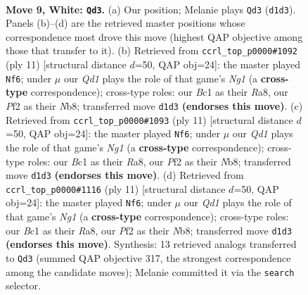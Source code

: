 \documentclass[11pt]{article}
\begin{document}
\clearpage

\begin{figure}[p]\centering
\begin{subfigure}{0.46\textwidth}\centering
\resizebox{\linewidth}{!}{%
\newchessgame
\chessboard[
  setfen={rnbqr1k1/ppp1bppp/4p3/3n4/2NP4/6P1/PP2PPBP/RNBQ1RK1 w - - 1 9},
  showmover=false,
  pgfstyle=straightmove, color=movearrow, markmove={d1-d3}
]}
\caption{}
\end{subfigure}\hfill
\begin{subfigure}{0.46\textwidth}\centering
\resizebox{\linewidth}{!}{%
\newchessgame
\chessboard[
  setfen={rnbqk1nr/pp2ppbp/3p2p1/8/3NP3/2N1B3/PPP2PPP/R2QKB1R b KQkq - 3 6},
  showmover=false,
  pgfstyle=straightmove, color=movearrow, markmove={g8-f6}
]}
\caption{}
\end{subfigure}
\\[4pt]
\begin{subfigure}{0.46\textwidth}\centering
\resizebox{\linewidth}{!}{%
\newchessgame
\chessboard[
  setfen={rnbqk1nr/pp2ppbp/3p2p1/8/3NP3/2N1B3/PPP2PPP/R2QKB1R b KQkq - 3 6},
  showmover=false,
  pgfstyle=straightmove, color=movearrow, markmove={g8-f6}
]}
\caption{}
\end{subfigure}\hfill
\begin{subfigure}{0.46\textwidth}\centering
\resizebox{\linewidth}{!}{%
\newchessgame
\chessboard[
  setfen={rnbqk1nr/pp2ppbp/3p2p1/8/3NP3/2N1B3/PPP2PPP/R2QKB1R b KQkq - 3 6},
  showmover=false,
  pgfstyle=straightmove, color=movearrow, markmove={g8-f6}
]}
\caption{}
\end{subfigure}
\caption{\textbf{Move 9, White: \texttt{Qd3}.} (a) Our position; Melanie plays \texttt{Qd3} (\texttt{d1d3}). Panels (b)--(d) are the retrieved master positions whose correspondence most drove this move (highest QAP objective among those that transfer to it). (b) Retrieved from \texttt{ccrl\_top\_p0000\#1092} (ply 11) [structural distance $d$=50, QAP obj=24]: the master played \texttt{Nf6}; under $\mu$ our \emph{Qd1} plays the role of that game's \emph{Ng1} (a \textbf{cross-type} correspondence); cross-type roles: our \emph{B}c1 as their \emph{R}a8, our \emph{P}f2 as their \emph{N}b8; transferred move \texttt{d1d3} \textbf{(endorses this move)}. (c) Retrieved from \texttt{ccrl\_top\_p0000\#1093} (ply 11) [structural distance $d$=50, QAP obj=24]: the master played \texttt{Nf6}; under $\mu$ our \emph{Qd1} plays the role of that game's \emph{Ng1} (a \textbf{cross-type} correspondence); cross-type roles: our \emph{B}c1 as their \emph{R}a8, our \emph{P}f2 as their \emph{N}b8; transferred move \texttt{d1d3} \textbf{(endorses this move)}. (d) Retrieved from \texttt{ccrl\_top\_p0000\#1116} (ply 11) [structural distance $d$=50, QAP obj=24]: the master played \texttt{Nf6}; under $\mu$ our \emph{Qd1} plays the role of that game's \emph{Ng1} (a \textbf{cross-type} correspondence); cross-type roles: our \emph{B}c1 as their \emph{R}a8, our \emph{P}f2 as their \emph{N}b8; transferred move \texttt{d1d3} \textbf{(endorses this move)}. Synthesis: 13 retrieved analogs transferred to \texttt{Qd3} (summed QAP objective 317, the strongest correspondence among the candidate moves); Melanie committed it via the \texttt{search} selector.}
\label{fig:thought-m16}
\end{figure}
\end{document}
